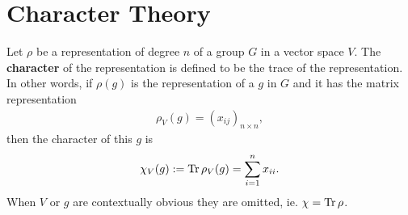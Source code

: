 \clearpage{\thispagestyle{empty}}
\section{Character Theory}

%	
%	
	
	\begin{definition}\label{def:character}
		Let $\rho$ be a representation of degree $n$ of a group $G$ in a vector space $V$. The \textbf{character} of the representation is defined to be the trace of the representation. In other words, if $\rho(g)$ is the representation of a $g$ in $G$ and it has the matrix representation
		\begin{align}
			\rho_V(g) = (x_{ij})_{n \times n},
		\end{align}
		then the character of this $g$ is
		\begin{align}
			\chi_V(g) := \Tr \rho_V(g) = \sum_{i=1}^{n} x_{ii}.\label{eq:deftrace}
		\end{align}
		When $V$ or $g$ are contextually obvious they are omitted, ie. $\chi = \Tr \rho$.
	\end{definition}
	
